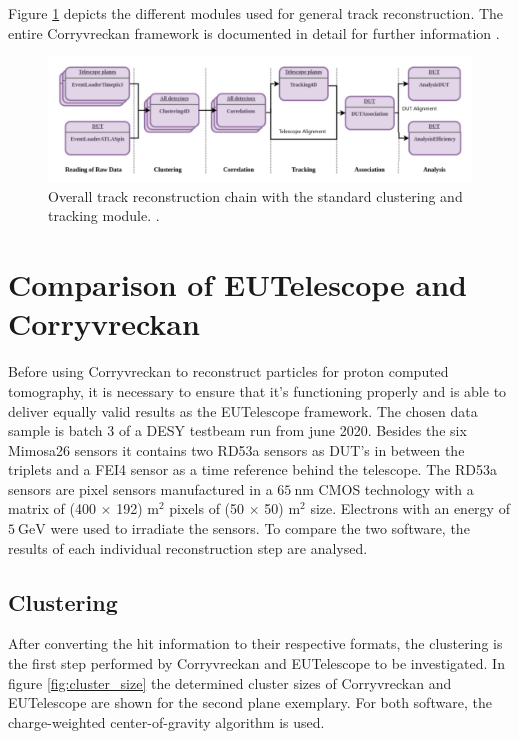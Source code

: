 Figure \ref{fig:corry_track_reco} depicts
the different modules used for general track reconstruction. The entire Corryvreckan framework is documented in detail for further information \cite{corry_manual}.

\begin{figure}
  \centering
  \includegraphics[height=0.3\textwidth]{images/corry.png}
  \caption{Overall track reconstruction chain with the standard clustering and tracking module. \cite{corry_track_reco}.}
  \label{fig:corry_track_reco}
\end{figure}

\chapter{Comparison of EUTelescope and Corryvreckan}\label{make}
Before using Corryvreckan to reconstruct particles for proton computed tomography, it is necessary to ensure that it's functioning properly
and is able to deliver equally valid results as the EUTelescope framework.
The chosen data sample is batch 3 of a DESY testbeam run from june 2020. Besides the six Mimosa26 sensors it contains two RD53a sensors
as DUT's in between the triplets and a FEI4 sensor as a time reference behind the telescope. The RD53a sensors are pixel sensors
manufactured in a $\SI{65}{\nano\meter}$ CMOS technology with a matrix of (400 $\times$ 192) \textmu m$^2$ pixels of
(50 $\times$ 50) \textmu m$^2$ size. Electrons with an energy of $\SI{5}{\GeV}$ were used to irradiate the sensors.
To compare the two software, the results of each individual
reconstruction step are analysed. \\

\section{Clustering}
After converting the hit information to their respective formats, the clustering is the first step performed by Corryvreckan and EUTelescope
to be investigated.
In figure \ref{fig:cluster_size} the determined cluster sizes of Corryvreckan and EUTelescope are shown for the second plane exemplary.
For both software, the charge-weighted center-of-gravity algorithm is used.

